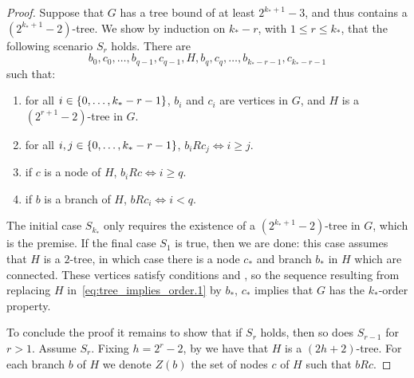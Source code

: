 \begin{theorem}
\begin{proof}
                Suppose that $G$ has a tree bound of at least $2^{k_*+1}-3$, and thus contains a $(2^{k_*+1}-2)$-tree.
                We show by induction on $k_*-r$, with $1 \leq r \leq k_*$, that the following scenario $S_r$ holds.
                There are
                \begin{equation}\label{eq:tree_implies_order.1}
                    b_0, c_0, \dots, b_{q-1}, c_{q-1}, H, b_q, c_q, \dots, b_{k_*-r-1}, c_{k_*-r-1}
                \end{equation}
                such that:
                \begin{enumerate}
                    \item\label{itm:tree_implies_order.1} for all $i \in \{ 0, \dots, k_*-r-1 \}$, $b_i$ and $c_i$ are vertices in $G$,
                        and $H$ is a $(2^{r+1}-2)$-tree in $G$.
                    \item\label{itm:tree_implies_order.2} for all $i,j \in \{ 0, \dots, k_*-r-1 \}$, $b_i R c_j \Leftrightarrow i \geq j$.
                    \item\label{itm:tree_implies_order.3} if $c$ is a node of $H$, $b_i R c \Leftrightarrow i \geq q$.
                    \item\label{itm:tree_implies_order.4} if $b$ is a branch of $H$, $b R c_i \Leftrightarrow i < q$.
                \end{enumerate}

                The initial case $S_{k_*}$ only requires the existence of a $(2^{k_*+1}-2)$-tree in $G$, which is the premise.
                If the final case $S_1$ is true, then we are done:
                this case assumes that $H$ is a $2$-tree, in which case there is a node $c_*$ and branch $b_*$ in $H$ which
                are connected.
                These vertices satisfy conditions  and , so
                the sequence resulting from replacing $H$ in~\eqref{eq:tree_implies_order.1} by $b_*$, $c_*$ implies that $G$
                has the $k_*$-order property. 

                To conclude the proof it remains to show that if $S_r$ holds, then so does $S_{r-1}$ for $r>1$.
                Assume $S_r$.
                Fixing $h = 2^r - 2$, by  we have that $H$ is a $(2h +2)$-tree.
                For each branch $b$ of $H$ we denote $Z(b)$ the set of nodes $c$ of $H$ such that $b R c$.


\end{proof}
\end{theorem}
